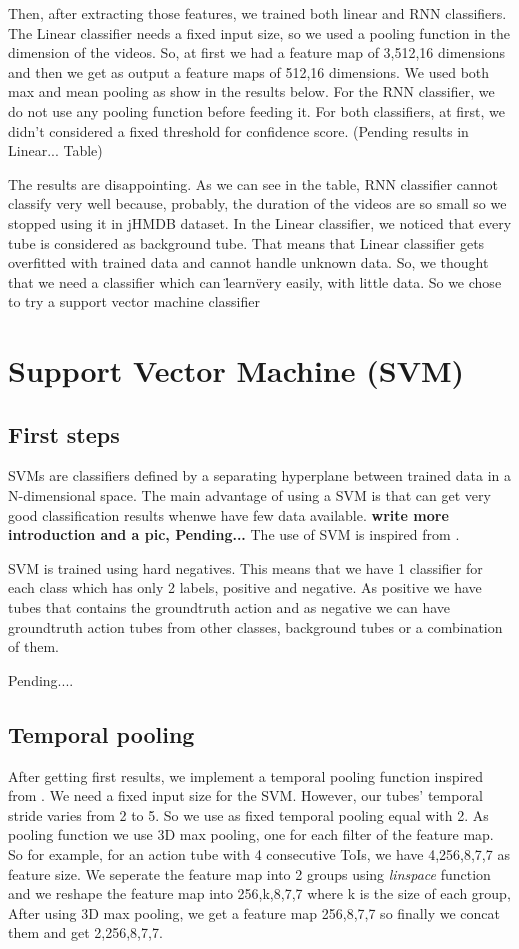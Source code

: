 \documentclass{report}
\begin{document}
Then, after extracting those features, we trained both linear and RNN classifiers. The Linear classifier needs a fixed input size,
so we used a pooling function in the dimension of the videos. So, at first we had a feature map of 3,512,16 dimensions and then we
get as output a feature maps of 512,16 dimensions. We used both max and mean pooling as show in the results below. For the RNN
classifier, we do not use any pooling function before feeding it. For both classifiers, at first, we didn't considered a fixed
threshold for confidence score.
(Pending results in Linear... Table)

The results are disappointing.
As we can see in the table, RNN classifier cannot classify very well because, probably, the duration of the videos are so small
so we stopped using it in jHMDB dataset. In the Linear classifier, we noticed that every tube is considered as background tube.
That means that Linear classifier gets overfitted with trained data and cannot handle unknown data. So, we thought that we
need a classifier which can \"learn\" very easily, with little data. So we chose to try a support vector machine classifier

\section{Support Vector Machine (SVM)}
\subsection{First steps}
SVMs are classifiers defined by a separating hyperplane between trained data in a N-dimensional space. The main advantage of using a SVM
is that can get very good classification results whenwe have few data available.
\textbf{write more introduction and a pic, Pending...}
The use of SVM is inspired from \cite{Girshick:2015:FR:2919332.2920125}. \par
SVM is trained using hard negatives. This means that we have 1 classifier for each class which has only 2 labels, positive and negative.
As positive we have tubes that contains the groundtruth action and as negative we can have  groundtruth action tubes from other classes,
background tubes or a combination of them.

Pending....

\subsection{Temporal pooling}
After getting first results, we implement a temporal pooling function inspired from \cite{DBLP:journals/corr/HouCS17}. We need a
fixed input size for the SVM. However, our tubes' temporal stride varies from 2 to 5. So we use as fixed temporal pooling equal
with 2. As pooling function we use 3D max pooling, one for each filter of the feature map.  So for example, for an action tube
with 4 consecutive ToIs, we  have 4,256,8,7,7 as feature size. We seperate the feature map into 2 groups using \textit{linspace}
function and we reshape the feature map into 256,k,8,7,7 where k is the size of each group, After using 3D max pooling, we get
a feature map 256,8,7,7 so finally we concat them and get 2,256,8,7,7.
\end{document}
